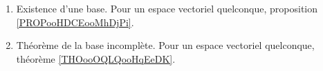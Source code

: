 

\begin{enumerate}
	\item
	      Existence d'une base. Pour un espace vectoriel quelconque, proposition \ref{PROPooHDCEooMhDjPi}.
	\item
	      Théorème de la base incomplète. Pour un espace vectoriel quelconque, théorème \ref{THOooOQLQooHqEeDK}.
\end{enumerate}

